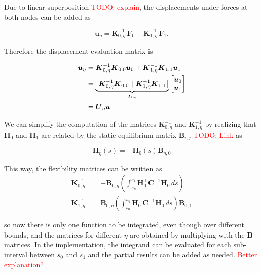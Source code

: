 Due to linear superposition \textcolor{red}{TODO: explain}, the displacements under forces at both nodes can be added as

\begin{equation}
\boldsymbol{u}_{\eta} = \boldsymbol{K}_{0,\eta}^{-1}\,\boldsymbol{F}_0 + \boldsymbol{K}_{1,\eta}^{-1}\,\boldsymbol{F}_1.
\end{equation}

Therefore the displacement evaluation matrix is

\begin{align}
\boldsymbol{u}_{\eta} &= \boldsymbol{K}_{0,\eta}^{-1}\boldsymbol{K}_{0,0}\boldsymbol{u}_0 + \boldsymbol{K}_{1,\eta}^{-1}\boldsymbol{K}_{1,1}\boldsymbol{u}_1 \\
&=
\underbrace{
\left[\boldsymbol{K}_{0,\eta}^{-1}\boldsymbol{K}_{0,0} \ \vert\ \boldsymbol{K}_{1,\eta}^{-1}\boldsymbol{K}_{1,1}\right]
}_{\boldsymbol{U}_\eta}
\begin{bmatrix}
\boldsymbol{u}_0 \notag \\
\boldsymbol{u}_1
\end{bmatrix} \notag \\
&=\boldsymbol{U}_\eta\boldsymbol{u}
\end{align}

We can simplify the computation of the matrices $\boldsymbol{K}_{0,\eta}^{-1}$ and $\boldsymbol{K}^{-1}_{1,\eta}$ by realizing that $\boldsymbol{H}_0$ and $\boldsymbol{H}_1$ are related by the static equilibrium matrix $\boldsymbol{B}_{i,j}$ \textcolor{red}{TODO: Link} as

\begin{equation}
\boldsymbol{H}_\eta(s) = -\boldsymbol{H}_0(s)\boldsymbol{B}_{\eta,0}
\end{equation}

This way, the flexibility matrices can be written as
%
\begin{align}
\boldsymbol{K}_{0,\eta}^{-1} &= -\boldsymbol{B}_{0,\eta}^\intercal\left(\int_{s_\eta}^{s_1} \boldsymbol{H}_0^\intercal\boldsymbol{C}^{-1}\boldsymbol{H}_0\,ds\right) \\
\boldsymbol{K}^{-1}_{1,\eta} &= \boldsymbol{B}_{0,\eta}^\intercal\left(\int_{s_0}^{s_\eta} \boldsymbol{H}_0^\intercal\boldsymbol{C}^{-1}\boldsymbol{H}_0\,ds\right)\boldsymbol{B}_{0,1}
\end{align}

so now there is only one function to be integrated, even though over different bounds, and the matrices for different $\eta$ are obtained by multiplying with the $\boldsymbol{B}$ matrices.
In the implementation, the integrand can be evaluated for each sub-interval between $s_0$ and $s_1$ and the partial results can be added as needed. \textcolor{red}{Better explanation?}

